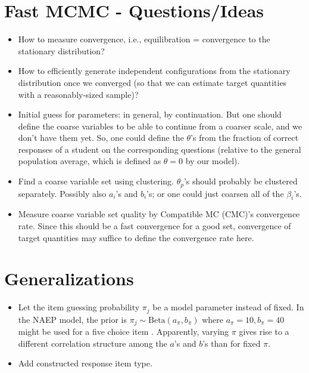 \documentclass{article}
\newcommand{\ta}{\theta}
\begin{document}
\section{Fast MCMC - Questions/Ideas}
\begin{itemize}
	\item How to measure convergence, i.e., equilibration = convergence to the stationary distribution? 
	\item How to efficiently generate independent configurations from the stationary distribution once we converged
	(so that we can estimate target quantities with a reasonably-sized sample)?
	\item Initial guess for parameters: in general, by continuation. But one should define the coarse variables
	to be able to continue from a coarser scale, and we don't have them yet. So, one could define the $\ta$'s
	from the fraction of correct responses of a student on the corresponding questions (relative to the general
	population average, which is defined as $\ta=0$ by our model).
	\item Find a coarse variable set using clustering. $\ta_p$'s should probably be clustered separately. 	Possibly also $a_i$'s and $b_i$'s; or one could just coarsen all of the $\beta_i$'s.
	\item Measure coarse variable set quality by Compatible MC (CMC)'s convergence rate. Since this should be a fast convergence for a good set, convergence of target quantities may suffice to define the convergence rate here.
\end{itemize}

\section{Generalizations}
\begin{itemize}
	\item Let the item guessing probability $\pi_j$ be a model parameter instead of fixed. In the NAEP model,
	the prior is $\pi_j \sim {\mbox{Beta}}(a_{\pi}, b_{\pi})$ where $a_{\pi}=10, b_{\pi}=40$ might be used for a five
	choice item \cite{matt02}. Apparently, varying $\pi$ gives rise to a different correlation structure among the $a$'s and $b$'s than for fixed $\pi$.
	\item Add constructed response item type.
\end{itemize}



\end{document}
